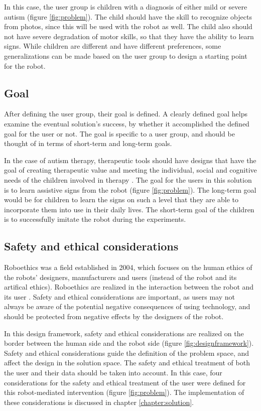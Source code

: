 In this case, the user group is children with a diagnosis of either mild or severe autism (figure \ref{fig:problem}). The child should have the skill to recognize objects from photos, since this will be used with the robot as well. The child also should not have severe degradation of motor skills, so that they have the ability to learn signs. While children are different and have different preferences, some generalizations can be made based on the user group to design a starting point for the robot. 



\subsection{Goal}

After defining the user group, their goal is defined. A clearly defined goal helps examine the eventual solution's success, by whether it accomplished the defined goal for the user or not. The goal is specific to a user group, and should be thought of in terms of short-term and long-term goals.

In the case of autism therapy, therapeutic tools should have designs that have the goal of creating therapeutic value and meeting the individual, social and cognitive needs of the children involved in therapy \cite{designSpaces}. The goal for the users in this solution is to learn assistive signs from the robot (figure \ref{fig:problem}). The long-term goal would be for children to learn the signs on such a level that they are able to incorporate them into use in their daily lives. The short-term goal of the children is to successfully imitate the robot during the experiments. 


\subsection{Safety and ethical considerations}


Roboethics was a field established in 2004, which focuses on the human ethics of the robots' designers, manufacturers and users (instead of the robot and its artifical ethics). Roboethics are realized in the interaction between the robot and its user  \cite{Veruggio2008}. Safety and ethical considerations are important, as users may not always be aware of the potential negative consequences of using technology, and should be protected from negative effects by the designers of the robot.

In this design framework, safety and ethical considerations are realized on the border between the human side and the robot side (figure \ref{fig:designframework}). Safety and ethical considerations guide the definition of the problem space, and affect the design in the solution space. The safety and ethical treatment of both the user and their data should be taken into account. In this case, four considerations for the safety and ethical treatment of the user were defined for this robot-mediated intervention (figure \ref{fig:problem}). The implementation of these considerations is discussed in chapter \ref{chapter:solution}.

